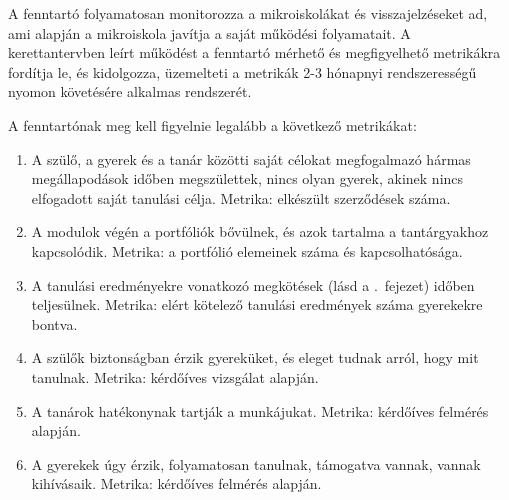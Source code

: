 A fenntartó folyamatosan monitorozza a mikroiskolákat és visszajelzéseket ad,
ami alapján a mikroiskola javítja a saját működési folyamatait. A kerettantervben leírt működést a
fenntartó mérhető és megfigyelhető metrikákra fordítja le, és kidolgozza,
üzemelteti a metrikák 2-3 hónapnyi rendszerességű nyomon követésére alkalmas
rendszerét.

A fenntartónak meg kell figyelnie legalább a következő metrikákat:
\begin{enumerate}
      \item A szülő, a gyerek és a tanár közötti saját célokat megfogalmazó
            hármas
            megállapodások időben megszülettek, nincs olyan gyerek, akinek
            nincs
            elfogadott
            saját tanulási célja. Metrika: elkészült szerződések száma.

      \item A modulok végén a portfóliók bővülnek, és azok tartalma a
            tantárgyakhoz
            kapcsolódik. Metrika: a portfólió elemeinek száma és kapcsolhatósága.
      \item A tanulási eredményekre vonatkozó megkötések
            (lásd a .~fejezet) időben teljesülnek.
            Metrika: elért kötelező tanulási eredmények száma gyerekekre
            bontva.

      \item A szülők biztonságban érzik gyereküket, és eleget tudnak arról,
            hogy
            mit
            tanulnak. Metrika: kérdőíves vizsgálat alapján.

      \item A tanárok hatékonynak tartják a munkájukat. Metrika: kérdőíves felmérés
            alapján.

      \item A gyerekek úgy érzik, folyamatosan tanulnak, támogatva vannak,
            vannak
            kihívásaik. Metrika: kérdőíves felmérés alapján.
\end{enumerate}
